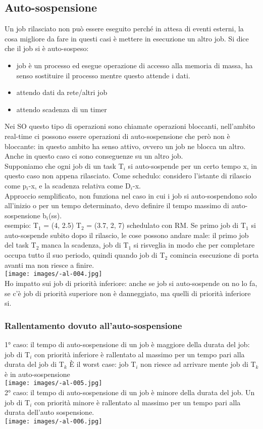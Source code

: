 \documentclass{article}
\begin{document}
\subsection{Auto-sospensione}
Un job rilasciato non può essere eseguito perché in attesa di eventi esterni, la cosa migliore da fare in questi casi è mettere in esecuzione un altro job. Si dice che il job si è auto-sospeso:
\begin{itemize}
\item job è un processo ed esegue operazione di accesso alla memoria di massa, ha senso sostituire il processo mentre questo attende i dati.
\item attendo dati da rete/altri job
\item attendo scadenza di un timer
\end{itemize}
Nei SO questo tipo di operazioni sono chiamate operazioni bloccanti, nell'ambito real-time ci possono essere operazioni di auto-sospensione che però non è bloccante: in questo ambito ha senso attivo, ovvero un job ne blocca un altro. Anche in questo caso ci sono conseguenze su un altro job.\\ Supponiamo che ogni job di un task T$_{i}$ si auto-sospende per un certo tempo x, in questo caso non appena rilasciato. Come schedulo: considero l'istante di rilascio come p$_{i}$-x, e la scadenza relativa come D$_{i}$-x.\\ Approccio semplificato, non funziona nel caso in cui i job si auto-sospendono solo all'inizio o per un tempo determinato, devo definire il tempo massimo di auto-sospensione b$_{i}$(ss).\\ esempio: T$_{1}$ = (4, 2.5) T$_{2}$ = (3.7, 2, 7) schedulato con RM. Se primo job di T$_{1}$ si auto-sospende subito dopo il rilascio, le cose possono andare male: il primo job del task T$_{2}$ manca la scadenza, job di T$_{1}$ si risveglia in modo che per completare occupa tutto il suo periodo, quindi quando job di T$_{2}$ comincia esecuzione di porta avanti ma non riesce a finire.\\
\texttt{[image: images/-al-004.jpg]}\\
Ho impatto sui job di priorità inferiore: anche se job si auto-sospende on no lo fa, se c'è job di priorità superiore non è danneggiato, ma quelli di priorità inferiore si.
\subsubsection{Rallentamento dovuto all'auto-sospensione}
1° caso: il tempo di auto-sospensione di un job è maggiore della durata del job: job di T$_{i}$ con priorità inferiore è rallentato al massimo per un tempo pari alla durata del job di T$_{k}$ È il worst case: job T$_{i}$ non riesce ad arrivare mente job di T$_{k}$ è in auto-sospensione\\
\texttt{[image: images/-al-005.jpg]}\\
2° caso: il tempo di auto-sospensione di un job è minore della durata del job. Un job di T$_{i}$ con priorità minore è rallentato al massimo per un tempo pari alla durata dell'auto sospensione.\\
\texttt{[image: images/-al-006.jpg]}
\end{document}
